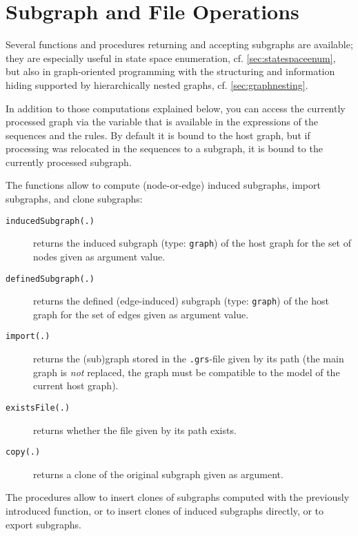 \section{Subgraph and File Operations}\label{sec:subgraphop}

Several functions and procedures returning and accepting subgraphs are available;
they are especially useful in state space enumeration, cf. \ref{sec:statespaceenum}, but also in graph-oriented programming with the structuring and information hiding supported by hierarchically nested graphs, cf. \ref{sec:graphnesting}.

In addition to those computations explained below, you can access the currently processed graph via the  \texttt{} variable that is available in the expressions of the sequences and the rules. 
By default it is bound to the host graph, but if processing was relocated in the sequences to a subgraph, it is bound to the currently processed subgraph.

The functions allow to compute (node-or-edge) induced subgraphs, import subgraphs, and clone subgraphs:

\begin{description}
\item[\texttt{inducedSubgraph(.)}] returns the induced subgraph (type: \texttt{graph}) of the host graph for the set of nodes given as argument value.
\item[\texttt{definedSubgraph(.)}] returns the defined (edge-induced) subgraph (type: \texttt{graph}) of the host graph for the set of edges given as argument value.
\item[\texttt{import(.)}] returns the (sub)graph stored in the \texttt{.grs}-file given by its path (the main graph is \emph{not} replaced, the graph must be compatible to the model of the current host graph).
\item[\texttt{existsFile(.)}] returns whether the file given by its path exists.
\item[\texttt{copy(.)}] returns a clone of the original subgraph given as argument.
\end{description}

The procedures allow to insert clones of subgraphs computed with the previously introduced function,
or to insert clones of induced subgraphs directly,
or to export subgraphs.

